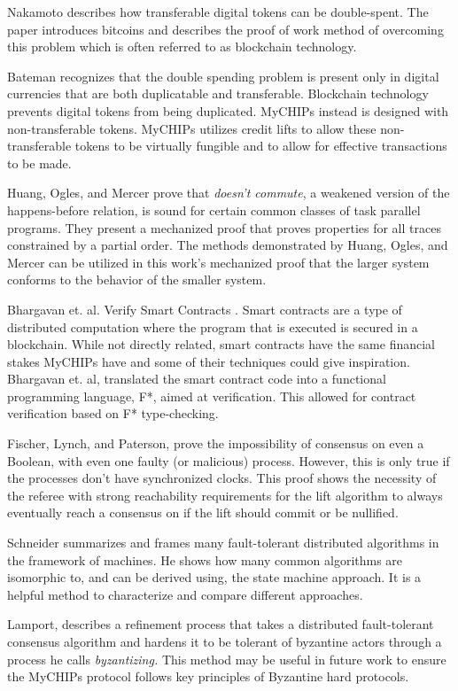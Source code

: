 \documentclass[runningheads]{llncs}
\begin{document}
 Nakamoto describes how transferable digital tokens can be double-spent. The paper introduces bitcoins and describes the proof of work method of overcoming this problem which is often referred to as blockchain technology. \cite{bitcoin} 

 Bateman recognizes that the double spending problem is present only in digital currencies that are both duplicatable and transferable. Blockchain technology prevents digital tokens from being duplicated. MyCHIPs instead is designed with non-transferable tokens. MyCHIPs utilizes credit lifts to allow these non-transferable tokens to be virtually fungible and to allow for effective transactions to be made. 
 
 Huang, Ogles, and Mercer prove that \emph{doesn't commute}, a weakened version of the happens-before relation, is sound for certain common classes of task parallel programs. They present a mechanized proof that proves properties for all traces constrained by a partial order. The methods demonstrated by Huang, Ogles, and Mercer can be utilized in this work's mechanized proof that the larger system conforms to the behavior of the smaller system. \cite{ben_DC}

 Bhargavan et. al. Verify Smart Contracts \cite{SmartContracts}. Smart contracts are a type of distributed computation where the program that is executed is secured in a blockchain. While not directly related, smart contracts have the same financial stakes MyCHIPs have and some of their techniques could give inspiration.  Bhargavan et. al, translated the smart contract code into a functional programming language, F*, aimed at verification. This allowed for contract verification based on F* type-checking.
 
 
 Fischer, Lynch, and Paterson,\cite{Fischer} prove the impossibility of consensus on even a Boolean, with even one faulty (or malicious) process. However, this is only true if the processes don't have synchronized clocks. This proof shows the necessity of the referee with strong reachability requirements for the lift algorithm to always eventually reach a consensus on if the lift should commit or be nullified.
 
 
 Schneider summarizes and frames many fault-tolerant distributed algorithms in the framework of  machines\cite{StateMachine}. He shows how many common algorithms are isomorphic to, and can be derived using, the state machine approach. It is a helpful method to characterize and compare different approaches.
 
 Lamport\cite{Lamport}, describes a refinement process that takes a distributed fault-tolerant consensus algorithm and hardens it to be tolerant of byzantine actors through a process he calls \emph{byzantizing.} This method may be useful in future work to ensure the MyCHIPs protocol follows key principles of Byzantine hard protocols.
 
\end{document}
